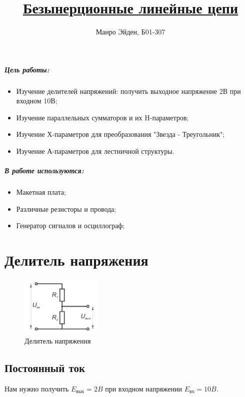 \documentclass[a4paper]{article}
\title{\underline{Безынерционные линейные цепи}}
\author{Манро Эйден, Б01-307}
\date{}
\begin{document}
\maketitle
\begin{center}
\Large{\textbf{ }}
\end{center}

\subparagraph{Цель работы:}

\begin{itemize}
    \item Изучение делителей напряжений: получить выходное напряжение 2В при входном 10В;
    \item Изучение параллельных сумматоров и их H-параметров;
    \item Изучение Х-параметров для преобразования "Звезда - Треугольник";
    \item Изучение А-параметров для лестничной структуры.
\end{itemize}

\subparagraph{В работе используются:}

\begin{itemize}
    \item Макетная плата;
    \item Различные резисторы и провода;
    \item Генератор сигналов и осциллограф;
\end{itemize}

\section{Делитель напряжения}

\begin{figure}
    \includegraphics[width = 0.35\textwidth]{splitter.png}
    \caption[width = 0.95\textwidth]{Делитель напряжения}
\end{figure}

\subsection{Постоянный ток}

Нам нужно получить $E_\text{вых} = 2B$ при входном напряжении $E_\text{вх} = 10B$.
\end{document}
